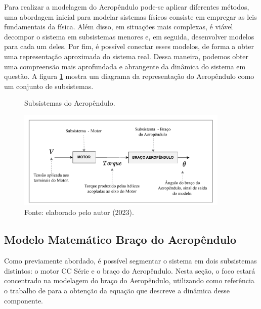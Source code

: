 
Para realizar a modelagem do Aeropêndulo pode-se aplicar diferentes métodos, uma abordagem inicial para modelar sistemas físicos consiste em empregar as leis fundamentais da física. Além disso, em situações mais complexas, é viável decompor o sistema em subsistemas menores e, em seguida, desenvolver modelos para cada um deles. Por fim, é possível conectar esses modelos, de forma a obter uma representação aproximada do sistema real. Dessa maneira, podemos obter uma compreensão mais aprofundada e abrangente da dinâmica do sistema em questão. A figura \ref{fig4:image_01} mostra um diagrama da representação do Aeropêndulo como um conjunto de subsistemas.


\begin{figure}[!h]
	\centering
	\caption{Subsistemas do  Aeropêndulo.}
            \includegraphics[width=0.9\textwidth]{Capitulos/2_aeropendulo/4_figuras/subsistemas_aeropendulo.pdf}
	\caption*{Fonte: elaborado pelo autor (2023).}
        \label{fig4:image_01}
\end{figure}



\newpage

\subsection{ Modelo Matemático Braço do Aeropêndulo}
\label{modelagem_braco_aeropendulo}

Como previamente abordado, é possível segmentar o sistema em dois subsistemas distintos: o motor CC Série e o braço do Aeropêndulo. Nesta seção, o foco estará concentrado na modelagem do braço do Aeropêndulo, utilizando como referência o trabalho de \cite{amin} para a obtenção da equação que descreve a dinâmica desse componente.


